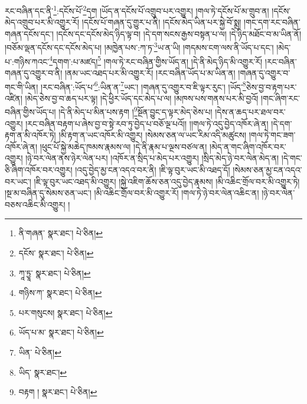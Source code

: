 རང་བཞིན་དང་ནི་\footnote{ནི་གཞན་  སྣར་ཐང་།  པེ་ཅིན། }:དངོས་པོ་\footnote{དངོས་  སྣར་ཐང་།  པེ་ཅིན། }དག །ཡོད་ན་དངོས་པོ་འགྲུབ་པར་འགྱུར། །གལ་ཏེ་དངོས་པོ་མ་གྲུབ་ན། །དངོས་མེད་འགྲུབ་པར་མི་འགྱུར་རོ། །དངོས་པོ་གཞན་དུ་གྱུར་པ་ནི། །དངོས་མེད་ཡིན་པར་སྐྱེ་བོ་སྨྲ། །གང་དག་རང་བཞིན་གཞན་དངོས་དང་། །དངོས་དང་དངོས་མེད་ཉིད་ལྟ་བ། །དེ་དག་སངས་རྒྱས་བསྟན་པ་ལ། །དེ་ཉིད་མཐོང་བ་མ་ཡིན་ནོ། །བཅོམ་ལྡན་དངོས་དང་དངོས་མེད་པ། །མཁྱེན་པས་:ཀ་ཏ་\footnote{ཀཱ་ཏྱཱ་  སྣར་ཐང་།  པེ་ཅིན། }ཡ་ན་ཡི། །གདམས་ངག་ལས་ནི་ཡོད་པ་དང་། །མེད་པ་:གཉིས་ཀའང་\footnote{གཉིས་ཀ་  སྣར་ཐང་།  པེ་ཅིན། }དགག་:པ་མཛད།\footnote{པར་གསུངས།  སྣར་ཐང་།  པེ་ཅིན། } །གལ་ཏེ་རང་བཞིན་གྱིས་ཡོད་ན། །དེ་ནི་མེད་ཉིད་མི་འགྱུར་རོ། །རང་བཞིན་གཞན་དུ་འགྱུར་བ་ནི། །ནམ་ཡང་འཐད་པར་མི་འགྱུར་རོ། །རང་བཞིན་ཡོད་པ་མ་ཡིན་ན། །གཞན་དུ་འགྱུར་བ་གང་གི་ཡིན། །རང་བཞིན་:ཡོད་པ་\footnote{ཡོད་པ་མ་  སྣར་ཐང་།  པེ་ཅིན། }:ཡིན་ན་\footnote{ཡིན་  པེ་ཅིན། }ཡང་། །གཞན་དུ་འགྱུར་བ་ཇི་ལྟར་རུང་། །ཡོད་\footnote{ཡིད་  སྣར་ཐང་། }ཅེས་བྱ་བ་རྟག་པར་འཛིན། །མེད་ཅེས་བྱ་བ་ཆད་པར་ལྟ། །དེ་ཕྱིར་ཡོད་དང་མེད་པ་ལ། །མཁས་པས་གནས་པར་མི་བྱའོ། །གང་ཞིག་རང་བཞིན་གྱིས་ཡོད་པ། །དེ་ནི་མེད་པ་མིན་པས་རྟག །\footnote{བརྟག །  སྣར་ཐང་།  པེ་ཅིན། }སྔོན་བྱུང་ད་ལྟར་མེད་ཅེས་པ། །དེས་ན་ཆད་པར་ཐལ་བར་འགྱུར། །རང་བཞིན་བརྟག་པ་ཞེས་བྱ་བ་སྟེ་རབ་ཏུ་བྱེད་པ་བཅོ་ལྔ་པའོ།། །།གལ་ཏེ་འདུ་བྱེད་འཁོར་ཞེ་ན། །དེ་དག་རྟག་ན་མི་འཁོར་ཏེ། །མི་རྟག་ན་ཡང་འཁོར་མི་འགྱུར། །སེམས་ཅན་ལ་ཡང་རིམ་འདི་མཚུངས། །གལ་ཏེ་གང་ཟག་འཁོར་ཞེ་ན། །ཕུང་པོ་སྐྱེ་མཆེད་ཁམས་རྣམས་ལ། །དེ་ནི་རྣམ་པ་ལྔས་བཙལ་ན། །མེད་ན་གང་ཞིག་འཁོར་བར་འགྱུར། །ཉེ་བར་ལེན་ནས་ཉེར་ལེན་པར། །འཁོར་ན་སྲིད་པ་མེད་པར་འགྱུར། །སྲིད་མེད་ཉེ་བར་ལེན་མེད་ན། །དེ་གང་ཅི་ཞིག་འཁོར་བར་འགྱུར། །འདུ་བྱེད་མྱ་ངན་འདའ་བར་ནི། །ཇི་ལྟ་བུར་ཡང་མི་འཐད་དོ། །སེམས་ཅན་མྱ་ངན་འདའ་བར་ཡང་། །ཇི་ལྟ་བུར་ཡང་འཐད་མི་འགྱུར། །སྐྱེ་འཇིག་ཆོས་ཅན་འདུ་བྱེད་རྣམས། །མི་འཆིང་གྲོལ་བར་མི་འགྱུར་ཏེ། །སྔ་མ་བཞིན་དུ་སེམས་ཅན་ཡང་། །མི་འཆིང་གྲོལ་བར་མི་འགྱུར་རོ། །གལ་ཏེ་ཉེ་བར་ལེན་འཆིང་ན། །ཉེ་བར་ལེན་བཅས་འཆིང་མི་འགྱུར། །
